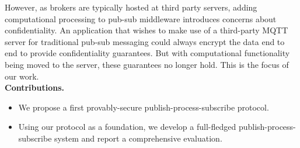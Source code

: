 However, as brokers are typically hosted at third party servers, adding
computational processing to pub-sub middleware  introduces concerns about
confidentiality. An application that wishes to make use of a third-party MQTT
server for traditional pub-sub messaging could always encrypt the data end to
end to provide confidentiality guarantees. But with computational functionality
being moved to the server, these guarantees no longer hold. This is the focus
of our work.\\[6pt]

\noindent\textbf{Contributions.}

\begin{itemize}[leftmargin=*]

	\item We propose a first provably-secure publish-process-subscribe protocol.

	\item Using our protocol as a foundation, we develop a full-fledged
publish-process-subscribe system and report a comprehensive evaluation.

\end{itemize}







